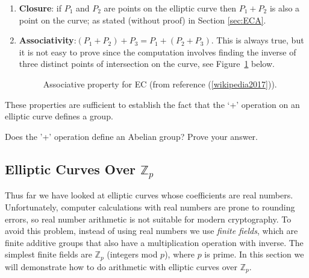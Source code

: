 \begin{enumerate}[1.]
\item \textbf{Closure}: if $P_1$ and $P_2$ are points on the elliptic curve then $P_1 + P_2$ is also a point on the curve; as stated (without proof) in Section \ref{sec:ECA}.
\item \textbf{Associativity}:$(P_1 + P_2) + P_3 = P_1 + (P_2 + P_3)$. This is always true, but it is not easy to prove since the computation involves finding the inverse of three distinct points of intersection on the curve, see Figure~\ref{fig:DH:DHKE_12} below.
\begin{figure}[H]
	  \caption{\label{fig:DH:DHKE_12} Associative property for EC (from reference (\ref{wikipedia2017})).}
\end{figure}
\end{enumerate}

These properties are sufficient to establish the fact that the `+' operation on an elliptic curve defines a group.

\begin{exercise}{}
Does the '+' operation define an Abelian group? Prove your answer.
\end {exercise}

\subsection{Elliptic Curves Over $\mathbb{Z}_p$} 

Thus far we have looked at elliptic curves whose coefficients are real numbers. Unfortunately, computer calculations with real numbers are prone to rounding errors, so real number arithmetic is not suitable for modern cryptography. To avoid this problem,  instead of using real numbers we use \emph{finite fields}, which are finite additive groups that also have a multiplication operation with inverse. The simplest finite fields are  $\mathbb{Z}_p$ (integers mod $p$),  where $p$ is prime. In this section we will demonstrate how to do arithmetic with elliptic curves over $\mathbb{Z}_p$.

